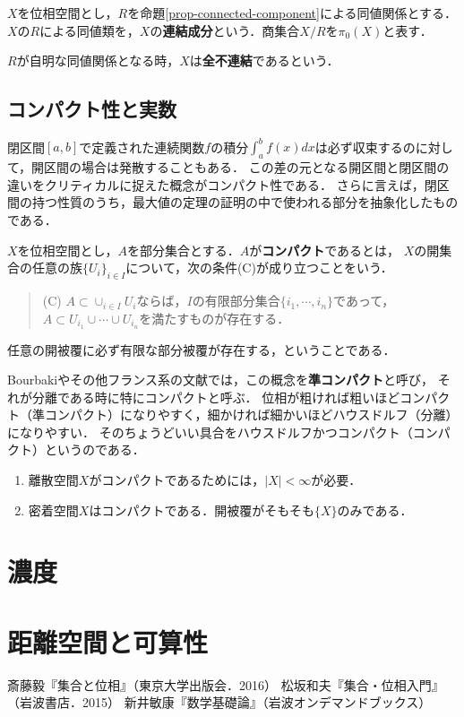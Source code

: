 \documentclass[uplatex,dvipdfmx]{jsreport}
\begin{document}
\begin{definition}
    $X$を位相空間とし，$R$を命題\ref{prop-connected-component}による同値関係とする．
    $X$の$R$による同値類を，$X$の\textbf{連結成分}という．商集合$X/R$を$\pi_0(X)$と表す．

    $R$が自明な同値関係となる時，$X$は\textbf{全不連結}であるという．
\end{definition}

\section{コンパクト性と実数}

\begin{screen}
    閉区間$[a,b]$で定義された連続関数$f$の積分$\int^b_af(x)dx$は必ず収束するのに対して，開区間の場合は発散することもある．
    この差の元となる開区間と閉区間の違いをクリティカルに捉えた概念がコンパクト性である．
    さらに言えば，閉区間の持つ性質のうち，最大値の定理の証明の中で使われる部分を抽象化したものである．
\end{screen}

\begin{definition}[compact]
    $X$を位相空間とし，$A$を部分集合とする．$A$が\textbf{コンパクト}であるとは，
    $X$の開集合の任意の族$\{U_i\}_{i\in I}$について，次の条件(C)が成り立つことをいう．
    \begin{quote}
        (C) $A\subset\cup_{i\in I}U_i$ならば，$I$の有限部分集合$\{i_1,\cdots,i_n\}$であって，$A\subset U_{i_1}\cup\cdots\cup U_{i_n}$を満たすものが存在する．
    \end{quote}
    任意の開被覆に必ず有限な部分被覆が存在する，ということである．
\end{definition}
\begin{remark}[quasicompact]
    Bourbakiやその他フランス系の文献では，この概念を\textbf{準コンパクト}と呼び，
    それが分離である時に特にコンパクトと呼ぶ．
    位相が粗ければ粗いほどコンパクト（準コンパクト）になりやすく，細かければ細かいほどハウスドルフ（分離）になりやすい．
    そのちょうどいい具合をハウスドルフかつコンパクト（コンパクト）というのである．
\end{remark}

\begin{example}\mbox{}
    \begin{enumerate}
        \item 離散空間$X$がコンパクトであるためには，$|X|<\infty$が必要．
        \item 密着空間$X$はコンパクトである．開被覆がそもそも$\{X\}$のみである．
    \end{enumerate}
\end{example}

\chapter{濃度}

\chapter{距離空間と可算性}

\begin{thebibliography}{9}
        斎藤毅『集合と位相』（東京大学出版会．2016）
        松坂和夫『集合・位相入門』（岩波書店．2015）
        新井敏康『数学基礎論』（岩波オンデマンドブックス）
\end{thebibliography}
\end{document}
